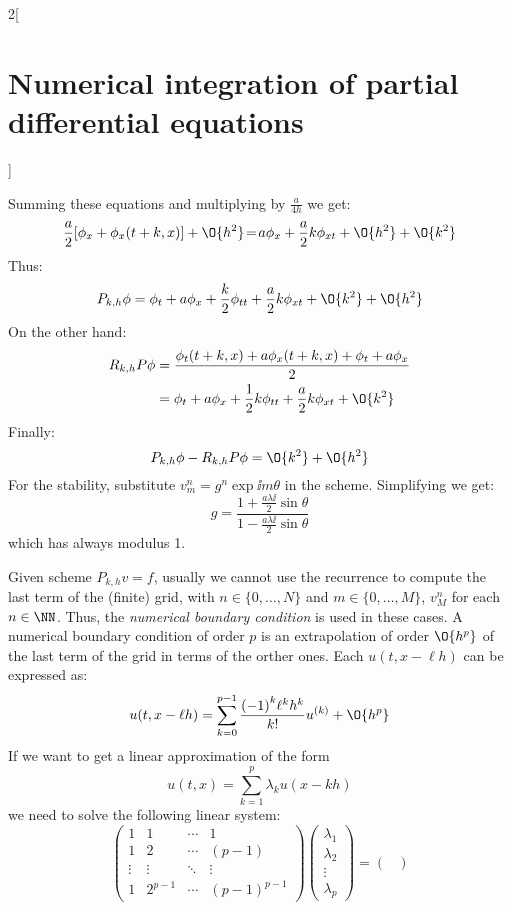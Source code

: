 \documentclass[../../../main_math.tex]{subfiles}
\begin{document}
\begin{multicols}{2}[\section{Numerical integration of partial differential equations}]
\begin{sproof}
    Summing these equations and multiplying by $\frac{a}{4h}$ we get:
    $$
      \frac{a}{2}[\phi_x+\phi_x(t+k,x)]+\O{h^2}\!=\!a\phi_x+\frac{a}{2}k\phi_{xt}+\O{h^2}+\O{k^2}
    $$
    Thus:
    $$
      P_{k,h}\phi=\phi_t+a\phi_x+\frac{k}{2}\phi_{tt}+\frac{a}{2}k\phi_{xt}+\O{k^2}+\O{h^2}
    $$
    On the other hand:
    \begin{align*}
      R_{k,h}P\phi & =\frac{\phi_t(t+k,x)+a\phi_x(t+k,x)+\phi_t+a\phi_x}{2}              \\
                   & =\phi_t+a\phi_x+\frac{1}{2}k\phi_{tt}+\frac{a}{2}k\phi_{xt}+\O{k^2}
    \end{align*}
    Finally:
    $$
      P_{k,h}\phi-R_{k,h}P\phi=\O{k^2}+\O{h^2}
    $$
    For the stability, substitute $v_m^n=g^n\exp{\ii m\theta}$ in the scheme. Simplifying we get:
    $$
      g=\frac{1+\frac{a\lambda\ii}{2}\sin\theta}{1-\frac{a\lambda\ii}{2}\sin\theta}
    $$
    which has always modulus 1.
  \end{sproof}
  \begin{definition}
    Given scheme $P_{k,h}{v}={f}$, usually we cannot use the recurrence to compute the last term of the (finite) grid, with $n\in\{0,\ldots,N\}$ and $m\in\{0,\ldots,M\}$, $v_M^{n}$ for each $n\in\NN$. Thus, the \emph{numerical boundary condition} is used in these cases. A numerical boundary condition of order $p$ is an extrapolation of order $\O{h^p}$ of the last term of the grid in terms of the orther ones. Each $u(t,x-\ell h)$ can be expressed as: $$u(t,x-\ell h)=\sum_{k=0}^{p-1}\frac{{(-1)}^k \ell^kh^k}{k!}u^{(k)}+\O{h^p}$$
    If we want to get a linear approximation of the form
    $$u(t,x)=\sum_{k=1}^{p}\lambda_ku(x-kh)$$
    we need to solve the following linear system:
    $$
      \begin{pmatrix}
        1      & 1       & \cdots & 1             \\
        1      & 2       & \cdots & {(p-1)}       \\
        \vdots & \vdots  & \ddots & \vdots        \\
        1      & 2^{p-1} & \cdots & {(p-1)}^{p-1}
      \end{pmatrix}
      \begin{pmatrix}
        \lambda_1 \\
        \lambda_2 \\
        \vdots    \\
        \lambda_p
      \end{pmatrix}=
      \begin{pmatrix}

\end{pmatrix}$$
\end{definition}
\end{multicols}
\end{document}
